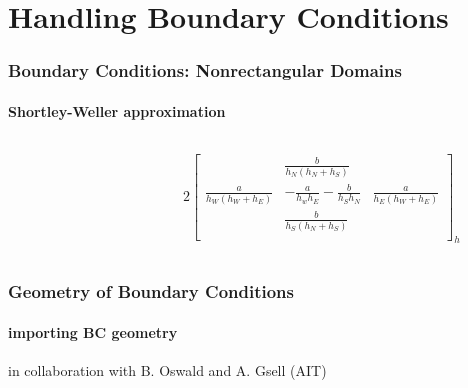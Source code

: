 \documentclass[xcolor=pdftex,table,10pt]{beamer}
\begin{document}



    \section{Handling Boundary Conditions}
    	
	\begin{frame}
		\frametitle{Boundary Conditions: Nonrectangular Domains}
		\framesubtitle{Shortley-Weller approximation}
	
		\begin{columns}
		\begin{column}{4cm}	
			
		\end{column}
		\begin{column}{6.5cm}	
		\small{	
			\[
				2 \begin{bmatrix}
				& \frac{b}{h_N (h_N + h_S)} & \\
				\frac{a}{h_W (h_W + h_E)} & -\frac{a}{h_w h_E} -\frac{b}{h_S h_N} & \frac{a}{h_E (h_W + h_E)} \\
				& \frac{b}{h_S (h_N + h_S)} & \\
				\end{bmatrix}_h
			\] 
		}
		\end{column}
		\end{columns}

	\end{frame}

%
%
%
%
%
	
	\begin{frame}
		\frametitle{Geometry of Boundary Conditions}
		\framesubtitle{importing BC geometry}

		\begin{center}
			
		\end{center}

		\small{in collaboration with B. Oswald and A. Gsell (AIT)}

	\end{frame}
\end{document}
